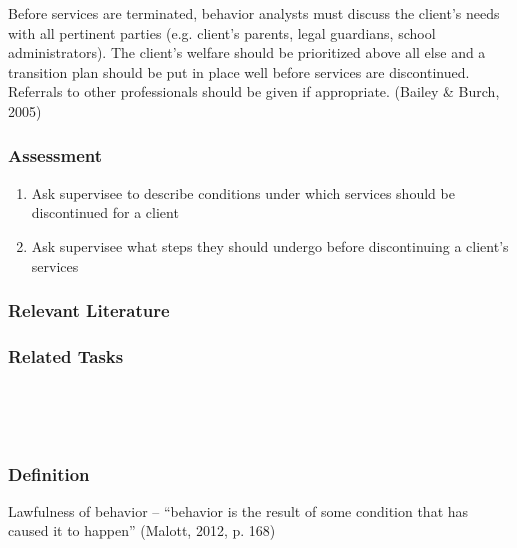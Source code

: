Before services are terminated, behavior analysts must discuss the client's needs with all pertinent parties (e.g. client's parents, legal guardians, school administrators). The client's welfare should be prioritized above all else and a transition plan should be put in place well before services are discontinued. Referrals to other professionals should be given if appropriate. (Bailey \& Burch, 2005)
%
\subsection{Assessment}
\begin{enumerate}
\item Ask supervisee to describe conditions under which services should be discontinued for a client
\item Ask supervisee what steps they should undergo before discontinuing a client's services
%
\end{enumerate}
%
\subsection{Relevant Literature}
\begin{refsection}
\nocite{test,alang2017police,clayton2018black}
\printbibliography[heading=none]
\end{refsection}
%
\subsection{Related Tasks}
\fourgSeven{}\\
\fourkNine{}\\
%
%
%
%
%
%
%
%
%
%
\chapter{\foursecFK{}}
\section{\fourFKOne{}}
\subsection{Definition}
Lawfulness of behavior – ``behavior is the result of some condition that has caused it to happen'' (Malott, 2012, p. 168)

